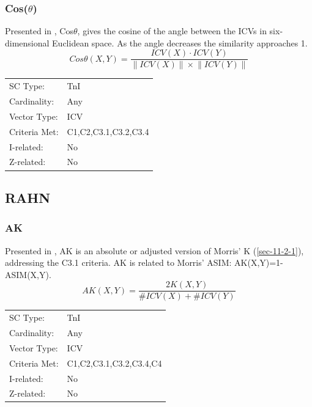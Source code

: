 \documentclass{article}
\begin{document}
\subsubsection{Cos($\theta$)}
\label{sec-11-5-3}

Presented in \citet{Rogers1992}, Cos$\theta$, gives the cosine of the
angle between the ICVs in six-dimensional Euclidean space. As the
angle decreases the similarity approaches 1.
$$Cos\theta(X,Y)=\frac{ICV(X)\cdot ICV(Y)}{\left\|ICV(X)\right\|\times\left\|ICV(Y)\right\|}$$

\begin{center}
\begin{tabular}{ll}
 SC Type:       &  TnI                   \\
 Cardinality:   &  Any                   \\
 Vector Type:   &  ICV                   \\
 Criteria Met:  &  C1,C2,C3.1,C3.2,C3.4  \\
 I-related:     &  No                    \\
 Z-related:     &  No                    \\
\end{tabular}
\end{center}
\subsection{RAHN}
\label{sec-11-6}
\subsubsection{AK}
\label{sec-11-6-1}

Presented in \citet[pp. 489]{Rahn1979}, AK is an absolute or adjusted
version of Morris' K (\ref{sec-11-2-1}), addressing the C3.1 criteria. AK is related
to Morris' ASIM: AK(X,Y)=1-ASIM(X,Y).
$$AK\left(X,Y\right)=\frac{2K\left(X,Y\right)}{\#ICV\left(X\right)+\#ICV\left(Y\right)}$$

\begin{center}
\begin{tabular}{ll}
 SC Type:       &  TnI                      \\
 Cardinality:   &  Any                      \\
 Vector Type:   &  ICV                      \\
 Criteria Met:  &  C1,C2,C3.1,C3.2,C3.4,C4  \\
 I-related:     &  No                       \\
 Z-related:     &  No                       \\
\end{tabular}
\end{center}
\end{document}
